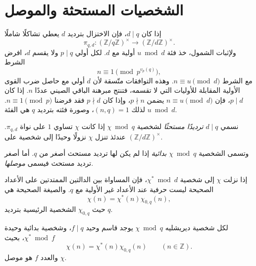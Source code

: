 \section{الشخصيات المستحثة والموصل}

إذا كان \(d\mid q\)، فإن الاختزال بترديد \(d\) يعطي تشاكلًا شاملًا
\[
\pi_{q,d}:(\mathbb Z/q\mathbb Z)^{\times}
\longrightarrow
(\mathbb Z/d\mathbb Z)^{\times}.
\]
ولإثبات الشمول، خذ فئة \(u\bmod d\) أولية مع \(d\). لكل أولي
\(p\mid q\) ولا يقسم \(d\)، افرض الشرط
\[
n\equiv1\pmod{p^{v_p(q)}},
\]
مع الشرط \(n\equiv u\pmod d\). وهذه التوافقات متّسقة لأن \(d\) أولي مع
حاصل ضرب القوى الأولية المقابلة للأوليات التي لا تقسمه، فتنتج مبرهنة
الباقي الصيني عددًا \(n\). إذا كان \(p\mid d\)، فإن
\(n\equiv u\pmod d\) يضمن \(p\nmid n\)، وإذا كان \(p\nmid d\) فقد
فرضنا \(n\equiv1\pmod p\). لذلك \((n,q)=1\)، وصورة فئته بترديد \(q\)
هي الفئة \(u\bmod d\).

\begin{definition}
نسمي \(d\mid q\) \emph{ترديدًا مستحثًا} لشخصية
\(\chi\bmod q\) إذا كانت \(\chi\) تساوي \(1\) على نواة
\(\pi_{q,d}\). عندئذ تنزل \(\chi\) نزولًا وحيدًا إلى شخصية على
\((\mathbb Z/d\mathbb Z)^{\times}\).

وتسمى الشخصية \(\chi\bmod q\) \emph{بدائية} إذا لم يكن لها ترديد
مستحث أصغر من \(q\). أما أصغر ترديد مستحث فيسمى \emph{موصلها}.
\end{definition}

إذا نزلت \(\chi\) إلى شخصية \(\chi^{*}\bmod d\)، فإن المساواة بين
الدالتين الممتدتين على الأعداد الصحيحة ليست حرفية عند الأعداد غير الأولية
مع \(q\). والصيغة الصحيحة هي
\[
\chi(n)=\chi^{*}(n)\chi_{0,q}(n),
\]
حيث \(\chi_{0,q}\) الشخصية الرئيسية بترديد \(q\).

\begin{theorem}
\label{thm:primitive-ancestor-conductor}
\provedhere
لكل شخصية ديريشليه \(\chi\bmod q\) يوجد قاسم وحيد \(f\mid q\)،
وشخصية بدائية وحيدة \(\chi^{*}\bmod f\)، بحيث
\[
\chi(n)=\chi^{*}(n)\chi_{0,q}(n)
\qquad(n\in\mathbb Z).
\]
والعدد \(f\) هو موصل \(\chi\).
\end{theorem}

